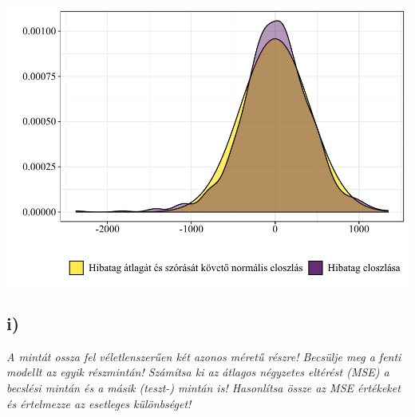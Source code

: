 \documentclass[
]{article}
\begin{document}
\includegraphics{econometrics_A2_files/figure-latex/unnamed-chunk-12-1.pdf}

\hypertarget{i}{%
\subsection{i)}\label{i}}

\emph{A mintát ossza fel véletlenszerűen két azonos méretű részre!
Becsülje meg a fenti modellt az egyik részmintán! Számítsa ki az átlagos
négyzetes eltérést (MSE) a becslési mintán és a másik (teszt-) mintán
is! Hasonlítsa össze az MSE értékeket és értelmezze az esetleges
különbséget!}
\end{document}
